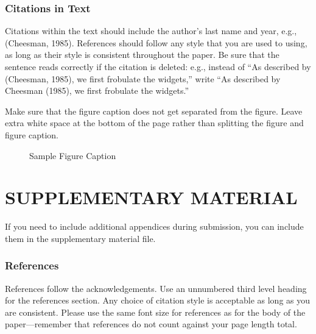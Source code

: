 \documentclass[twoside]{article}
\begin{document}






\subsubsection{Citations in Text}

Citations within the text should include the author's last name and
year, e.g., (Cheesman, 1985). References should follow any style that
you are used to using, as long as their style is consistent throughout
the paper.  Be sure that the sentence reads correctly if the citation
is deleted: e.g., instead of ``As described by (Cheesman, 1985), we
first frobulate the widgets,'' write ``As described by Cheesman
(1985), we first frobulate the widgets.''  %

Make sure that the figure caption does not get separated from the
figure. Leave extra white space at the bottom of the page rather than
splitting the figure and figure caption.
\begin{figure}[h]
\vspace{.3in}
\centerline{}
\vspace{.3in}
\caption{Sample Figure Caption}
\end{figure}


\section{SUPPLEMENTARY MATERIAL}

If you need to include additional appendices during submission, you
can include them in the supplementary material file.



\subsubsection*{References}

References follow the acknowledgements.  Use an unnumbered third level
heading for the references section.  Any choice of citation style is
acceptable as long as you are consistent.  Please use the same font
size for references as for the body of the paper---remember that
references do not count against your page length total.
\end{document}
